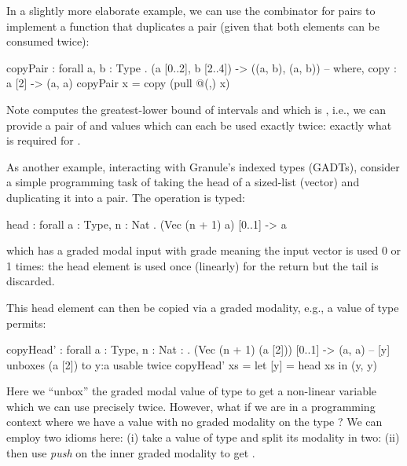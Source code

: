  In a slightly more elaborate example, we can use the  combinator
 for pairs to implement a function that duplicates a pair (given that both elements
 can be consumed twice):
\begin{granule}
copyPair : forall { a, b : Type } 
         . (a [0..2], b [2..4]) -> ((a, b), (a, b))
-- where, copy : a [2] -> (a, a)
copyPair x = copy (pull @(,) x) 
\end{granule}
 Note  computes the greatest-lower
 bound of intervals  and  which is
 , i.e., we can provide a pair of  and 
 values which can each be used exactly twice: exactly what is required
 for .
 
 As another example, interacting with Granule's indexed types
 (GADTs), consider a simple programming task of taking the head of a sized-list (vector)
 and duplicating it into a pair. The  operation
 is typed: 
\begin{granule}
head : forall { a : Type, n : Nat } 
     . (Vec (n + 1) a) [0..1] -> a
\end{granule}
 which has a graded modal input with grade  meaning
 the input vector is used 0 or 1 times:
 the head element is used once (linearly) for the return
 but the tail is discarded.
 
 This head element can then be copied via a graded
 modality, e.g., a value of type  permits:
\begin{granule}
copyHead' : forall { a : Type, n : Nat :} 
           . (Vec (n + 1) (a [2])) [0..1] -> (a, a)
-- [y] unboxes (a [2]) to y:a usable twice
copyHead' xs = let [y] = head xs in (y, y) 
\end{granule}
 Here we ``unbox'' the graded modal value of type  to
 get a non-linear variable  which we can use precisely twice.
 However, what if we are in a programming
 context where we have a value  with no
 graded modality on the type ? %
 We can employ two idioms here:
 (i) take a value of type  and
 split its modality in two: 
 (ii) then use \textit{push} on the inner graded modality
 \granin{[2]} to get
 .
 
